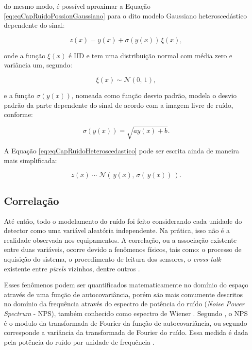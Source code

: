 \noindent do mesmo modo, é possível aproximar  a Equação \ref{eq:eqCapRuidoPossionGaussiano} para o dito modelo Gaussiano heteroscedástico dependente do sinal:

\begin{equation}
z(x) = y(x) + \sigma(y(x)) \, \xi(x),
\label{eq:eqCapRuidoHeteroscedastico}
\end{equation}

\noindent onde a função  $\xi(x)$ é \acs{IID} e tem uma distribuição normal com média zero e variância um, segundo:

\begin{equation}
\xi(x) \sim  \mathcal{N}(0,\,1),
\label{eq:eqCapRuidoHeteroscedastico1}
\end{equation}

\noindent e a função $\sigma(y(x)) $, nomeada como função desvio padrão, modela o desvio padrão da parte dependente do sinal de acordo com a imagem livre de ruído, conforme:

\begin{equation}
\sigma(y(x)) = \sqrt{ay(x)+b}.
\label{eq:eqCapRuidoHeteroscedasticoStd}
\end{equation} 

A Equação \ref{eq:eqCapRuidoHeteroscedastico} pode ser escrita ainda de maneira mais simplificada:

\begin{equation}
z(x) \sim  \mathcal{N}(\,y(x),\,\sigma(\,y(x)) \,).
\label{eq:eqCapRuidoHeteroscedasticoSimplificado}
\end{equation}

\subsection{Correlação}\label{Correlação}

Até então, todo o modelamento do ruído foi feito considerando cada unidade do detector como uma variável aleatória independente. Na prática, isso não é a realidade observada nos equipamentos. A correlação, ou a associação existente entre duas variáveis, ocorre devido a fenômenos físicos, tais como: o processo de aquisição do sistema, o procedimento de leitura dos sensores, o \textit{cross-talk} existente entre \textit{pixels} vizinhos, dentre outros \cite{morettin2010,bertalmiodenoising2018}. 

Esses fenômenos podem ser quantificados matematicamente no domínio do espaço através de uma função de autocovariância, porém são mais comumente descritos no domínio da frequência através do espectro de potência do ruído (\textit{Noise Power Spectrum} - \acs{NPS}), também conhecido como espectro de Wiener \cite[p. 485]{marshall2017handbook}. Segundo , o \acs{NPS} é o modulo da transformada de Fourier da função de autocovariância, ou segundo  corresponde a variância da transformada de Fourier do ruído. Essa medida é dada pela potência do ruído por unidade de frequência \cite{marshall2017handbook}.

